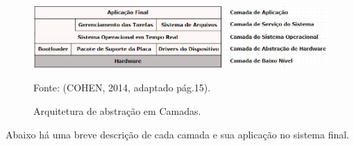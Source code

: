 \begin{figure}[h]
	\centering
	\caption{Arquitetura de abstração em Camadas.}
	
	\includegraphics[keepaspectratio=true,scale=0.7]{figuras/arquiteturaSof.PNG}
	
	Fonte: (COHEN, 2014,  adaptado pág.15).
	\label{fig22}
\end{figure}

Abaixo há uma breve descrição de cada camada e sua aplicação no sistema final.

